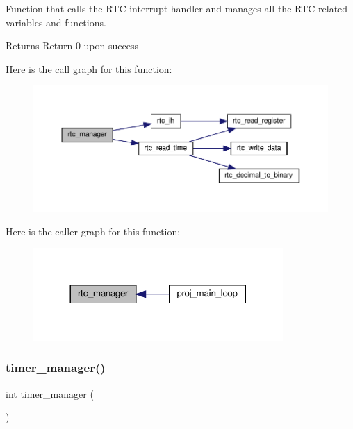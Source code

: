 Function that calls the R\+TC interrupt handler and manages all the R\+TC related variables and functions. 

\begin{DoxyReturn}{Returns}
Return 0 upon success 
\end{DoxyReturn}
Here is the call graph for this function\+:
\nopagebreak
\begin{figure}[H]
\begin{center}
\leavevmode
\includegraphics[width=350pt]{group__main__functions_gac1cad6d7c8507831aa74d165972cb1a9_cgraph}
\end{center}
\end{figure}
Here is the caller graph for this function\+:\nopagebreak
\begin{figure}[H]
\begin{center}
\leavevmode
\includegraphics[width=269pt]{group__main__functions_gac1cad6d7c8507831aa74d165972cb1a9_icgraph}
\end{center}
\end{figure}
\mbox{\label{group__main__functions_ga230337632aac7d793969e926a66f0249}} 
\subsubsection{\texorpdfstring{timer\+\_\+manager()}{timer\_manager()}}
{\footnotesize\ttfamily int timer\+\_\+manager (\begin{DoxyParamCaption}{ }\end{DoxyParamCaption})}



